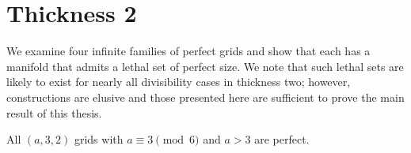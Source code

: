 
\section{Thickness 2}

We examine four infinite families of perfect grids and show that each has a manifold that admits a lethal set of perfect size. We note that such lethal sets are likely to exist for nearly all divisibility cases in thickness two; however, constructions are elusive and those presented here are sufficient to prove the main result of this thesis.

\begin{con}
All $(a,3,2)$ grids with $a \equiv 3 \pmod 6$ and $a >3$ are perfect. 
\end{con}

